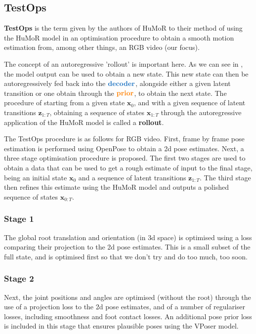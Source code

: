 \subsection{TestOps}
\label{sec:humor_test_ops}

\textbf{TestOps} is the term given by the authors of HuMoR to their method of using the HuMoR model in an optimisation procedure to obtain a smooth motion estimation from, among other things, an RGB video (our focus).

The concept of an autoregressive 'rollout' is important here. As we can see in , the model output can be used to obtain a new state. This new state can then be autoregressively fed back into the $\textbf{\textcolor{RoyalBlue}{decoder}}$, alongside either a given latent transition or one obtain through the $\textbf{\textcolor{orange}{prior}}$, to obtain the next state. The procedure of starting from a given state $\mathbf{x}_0$, and with a given sequence of latent transitions $\textbf{z}_{1:T}$, obtaining a sequence of states $\mathbf{x}_{1:T}$ through the autoregressive application of the HuMoR model is called a \textbf{rollout}.

The TestOps procedure is as follows for RGB video. First, frame by frame pose estimation is performed using OpenPose \cite{openPose} to obtain a 2d pose estimates. Next, a three stage optimisation procedure is proposed. The first two stages are used to obtain a data that can be used to get a rough estimate of input to the final stage, being an initial state $\mathbf{x}_0$ and a sequence of latent transitions $\textbf{z}_{1:T}$. The third stage then refines this estimate using the HuMoR model and outputs a polished sequence of states $\textbf{x}_{0:T}$.

\subsubsection{Stage 1}
The global root translation and orientation (in 3d space) is optimised using a loss comparing their projection to the 2d pose estimates. This is a small subset of the full state, and is optimised first so that we don't try and do too much, too soon.

\subsubsection{Stage 2}
\label{sec:humor_stage_2}
Next, the joint positions and angles are optimised (without the root) through the use of a projection loss to the 2d pose estimates, and of a number of regulariser losses, including smoothness and foot contact losses. An additional pose prior loss is included in this stage that ensures plausible poses using the VPoser \cite{VPoser} model. 

